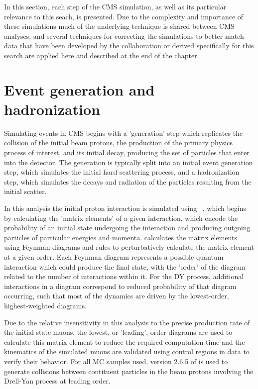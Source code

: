 In this section, each step of the CMS simulation, as well as its particular relevance to this seach, is presented.
Due to the complexity and importance of these simulations much of the underlying technique is shared between CMS analyses, and several techniques for correcting the simulations to better match data that have been developed by the collaboration or derived specifically for this search are applied here and described at the end of the chapter. 

\section{Event generation and hadronization}
Simulating events in CMS begins with a 'generation' step which replicates the collision of the initial beam protons, the production of the primary physics process of interest, and its initial decay, producing the set of particles that enter into the detector. 
The generation is typically split into an initial event generation step, which simulates the initial hard scattering process, and a hadronization step, which simulates the decays and radiation of the particles resulting from the initial scatter.

In this analysis the initial proton interaction is simulated using \mg~\cite{Maltoni_2003}, which begins by calculating the 'matrix elements' of a given interaction, which encode the probability of an initial state undergoing the interaction and producing outgoing particles of particular energies and momenta.
\mg calculates the matrix elements using Feynman diagrams and rules to perturbatively calculate the matrix element at a given order.
Each Feynman diagram represents a possible quantum interaction which could produce the final state, with the 'order' of the diagram related to the number of interactions within it. 
For the DY process, additional interactions in a diagram correspond to reduced probability of that diagram occurring, such that most of the dynamics are driven by the lowest-order, highest-weighted diagrams.

Due to the relative insensitivity in this analysis to the precise production rate of the initial state muons, the lowest, or 'leading', order diagrams are used to calculate this matrix element to reduce the required computation time and the kinematics of the simulated muons are validated using control regions in data to verify their behavior.
For all MC samples used, version 2.6.5 of \mg is used to generate collisions between contituent particles in the beam protons involving the Drell-Yan process at leading order. 

